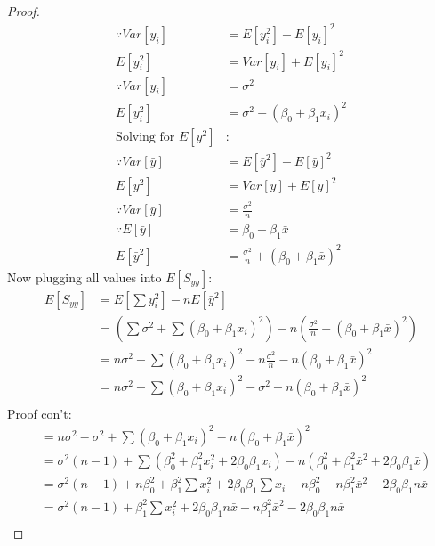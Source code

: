 \documentclass[12pt]{article}
\begin{document}
\begin{enumerate}[1.]
\begin{enumerate}[(a)]
\begin{proof}
\begin{align*}
                    \because Var[y_i] &= E[y_i^2] - E[y_i]^2 \\
                    E[y_i^2] &= Var[y_i] + E[y_i]^2 \\
                    \because Var[y_i] &= \sigma^2\\
                    E[y_i^2] &= \sigma^2 + (\beta_0 + \beta_1 x_i)^2 \\
                    \text{Solving for $E[\bar{y}^2]$} &: \\
                    \because Var[\bar{y}] &= E[\bar{y}^2] - E[\bar{y}]^2 \\
                    E[\bar{y}^2] &= Var[\bar{y}] + E[\bar{y}]^2 \\
                    \because Var[\bar{y}] &= \frac{\sigma^2}{n} \\ 
                    \because E[\bar{y}] &= \beta_0 + \beta_1 \bar{x} \\
                    E[\bar{y}^2] &= \frac{\sigma^2}{n} + (\beta_0 + \beta_1 \bar{x})^2
                \end{align*}
                Now plugging all values into $E[S_{yy}]$:
                \begin{align*}
                    E[S_{yy}] &= E[\sum y_i^2] - n E[\bar{y}^2] \\
                    &= (\sum\sigma^2 + \sum(\beta_0 + \beta_1 x_i)^2) - n (\frac{\sigma^2}{n} + (\beta_0 + \beta_1 \bar{x})^2) \\
                    &= n\sigma^2 + \sum(\beta_0 + \beta_1 x_i)^2 - n \frac{\sigma^2}{n} - n (\beta_0 + \beta_1 \bar{x})^2 \\
                    &= n\sigma^2 + \sum(\beta_0 + \beta_1 x_i)^2 - \sigma^2 - n (\beta_0 + \beta_1 \bar{x})^2 \\
                \end{align*}
                Proof con't:
                \begin{align*}
                    &= n\sigma^2 - \sigma^2 + \sum(\beta_0 + \beta_1 x_i)^2  - n (\beta_0 + \beta_1 \bar{x})^2 \\
                    &= \sigma^2(n - 1)+ \sum(\beta_0^2 + \beta_1^2 x_i^2 + 2\beta_0\beta_1 x_i) - n (\beta_0^2 + \beta_1^2 \bar{x}^2 + 2\beta_0\beta_1 \bar{x}) \\
                    &= \sigma^2(n - 1)+ n\beta_0^2 + \beta_1^2 \sum x_i^2 + 2\beta_0\beta_1 \sum x_i - n\beta_0^2 - n\beta_1^2 \bar{x}^2 - 2\beta_0\beta_1 n\bar{x} \\
                    &= \sigma^2(n - 1) + \beta_1^2 \sum x_i^2 + 2\beta_0\beta_1 n\bar{x}  - n\beta_1^2 \bar{x}^2 - 2\beta_0\beta_1 n\bar{x} \\

\end{align*}
\end{proof}
\end{enumerate}
\end{enumerate}
\end{document}
